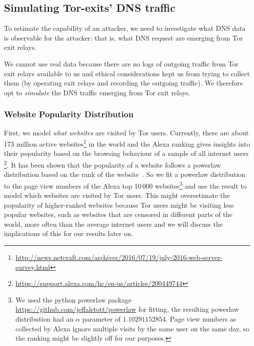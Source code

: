\subsection{Simulating Tor-exits' DNS traffic}
\label{sec:attack:sim}
To estimate the capability of an attacker, we need to investigate what
DNS data is observable for the attacker: that is, what DNS request are
emerging from Tor exit relays.

We cannot use real data because there are no logs of outgoing traffic
from Tor exit relays available to us and ethical considerations kept us
from trying to collect them (\eg by operating exit relays and recording
the outgoing traffic). We therefore opt to \emph{simulate} the DNS traffic
emerging from Tor exit relays.

\subsubsection{Website Popularity Distribution}
\label{sec:attack:pop}
First, we model \emph{what websites} are visited by Tor users.
Currently, there are about 173 million active
websites\footnote{\url{http://news.netcraft.com/archives/2016/07/19/july-2016-web-server-survey.html}}
in the world and the Alexa ranking gives insights into their popularity
based on the browsing behaviour of a sample of all internet users
\footnote{\url{https://support.alexa.com/hc/en-us/articles/200449744}}.
It has been shown that the popularity of a website follows a powerlaw
distribution based on the rank of the
website~\cite{DBLP:journals/network/MahantiCMAW13}. So
we fit a powerlaw distribution to the page view numbers of the Alexa top
10\,000 websites\footnote{We used the python powerlaw package
		\url{https://github.com/jeffalstott/powerlaw} for fitting, the
		resulting powerlaw distribution had an $\alpha$ parameter of
		$1.10291152854$. Page view numbers as collected by Alexa ignore
		multiple visits by the same user on the same day, so the ranking
		might be slightly off for our purposes.} and use the result to
model which websites are visited by Tor users.
This might overestimate the popularity of higher-ranked websites because
Tor users might be visiting less popular websites, such as websites that
are censored in different parts of the world, more often than the
average internet users and we will discuss the implications of this for
our results later on.

